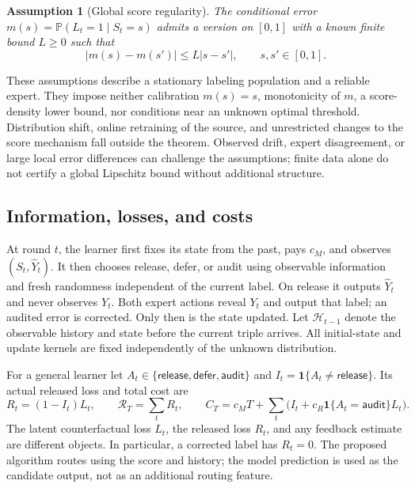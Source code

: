 \documentclass[11pt]{article}
\newtheorem{assumption}{Assumption}
\theoremstyle{remark}
\newcommand{\Pp}{\mathbb P}
\newcommand{\ind}{\mathbf 1}
\newcommand{\calR}{\mathcal R}
\newcommand{\calH}{\mathcal H}
\newcommand{\rel}{\mathsf{release}}
\newcommand{\defr}{\mathsf{defer}}
\newcommand{\audit}{\mathsf{audit}}
\begin{document}
\begin{assumption}[Global score regularity]
\label{ass:smooth}
The conditional error $m(s)=\Pp(L_t=1\mid S_t=s)$ admits a version on
$[0,1]$ with a known finite bound $L\ge0$ such that
\begin{equation}
 |m(s)-m(s')|\le L|s-s'|,\qquad s,s'\in[0,1].
 \label{eq:smooth}
\end{equation}
\end{assumption}
These assumptions describe a stationary labeling population and a reliable
expert. They impose neither calibration $m(s)=s$, monotonicity of $m$,
a score-density lower bound, nor conditions near an unknown optimal
threshold. Distribution shift, online retraining of the source, and
unrestricted changes to the score mechanism fall outside the theorem.
Observed drift, expert disagreement, or large local error differences can
challenge the assumptions; finite data alone do not certify a global
Lipschitz bound without additional structure.

\subsection{Information, losses, and costs}

At round $t$, the learner first fixes its state from the past, pays $c_M$,
and observes $(S_t,\widehat Y_t)$. It then chooses release, defer, or
audit using observable information and fresh randomness independent of
the current label. On release it outputs $\widehat Y_t$ and never
observes $Y_t$. Both expert actions reveal $Y_t$ and output that label;
an audited error is corrected. Only then is the state updated.
Let $\calH_{t-1}$ denote the observable history and state before the
current triple arrives. All initial-state and update kernels are fixed
independently of the unknown distribution.

For a general learner let $A_t\in\{\rel,\defr,\audit\}$ and
$I_t=\ind\{A_t\ne\rel\}$. Its actual released loss and total cost are
\begin{equation}
 R_t=(1-I_t)L_t,\qquad \calR_T=\sum_t R_t,\qquad
 C_T=c_MT+\sum_t\bigl(I_t+c_R\ind\{A_t=\audit\}L_t\bigr).
 \label{eq:ledger}
\end{equation}
The latent counterfactual loss $L_t$, the released loss $R_t$, and any
feedback estimate are different objects. In particular, a corrected label
has $R_t=0$. The proposed algorithm routes using the score and history;
the model prediction is used as the candidate output, not as an additional
routing feature.
\end{document}
